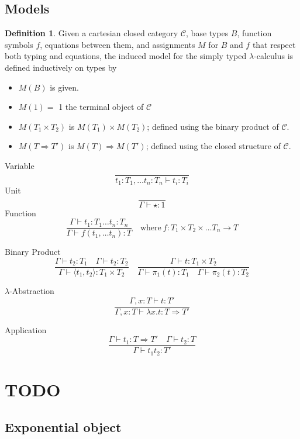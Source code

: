 \documentclass{article}
\theoremstyle{definition}
\newtheorem{definition}{Definition}[section]
\newcommand{\C}{\mathcal{C}}
\begin{document}
\subsection{Models}
\begin{definition}
    Given a cartesian closed category $\C$,
    base types $B$,
    function symbols $f$,
    equations between them,
    and assignments $M$ for $B$ and $f$ that respect both typing and equations,
    the induced model for the simply typed $\lambda$-calculus is defined inductively on types by
    \begin{itemize}
        \item $M(B)$ is given.
        \item $M(1) =$ 1 the terminal object of $\C$
        \item $M(T_1 \times T_2)$ is $M(T_1) \times M(T_2)$;
            defined using the binary product of $\C$.
        \item $M(T \Rightarrow T\prime)$ is $M(T) \Rightarrow M(T\prime)$;
            defined using the closed structure of $\C$.
    \end{itemize}
    Variable
    $$
    \frac{}{t_1 : T_1, \dots t_n : T_n \vdash t_i : T_i}
    $$
    Unit
    $$
    \frac{}{\Gamma \vdash \star : 1}
    $$
    Function
    $$
    \frac{\Gamma \vdash t_1 : T_1 \dots t_n : T_n}{\Gamma \vdash f(t_1,\dots t_n) : T}
    \quad\textrm{where}\ f : T_1 \times T_2 \times \dots T_n \rightarrow T
    $$

    Binary Product
    $$
    \frac
    {\Gamma \vdash t_2 : T_1 \quad \Gamma \vdash t_2 : T_2}
    {\Gamma \vdash \langle t_1, t_2 \rangle : T_1 \times T_2}
    \quad
    \frac
    {\Gamma \vdash t : T_1 \times T_2}
    {\Gamma \vdash \pi_1(t) : T_1 \quad \Gamma \vdash \pi_2(t) : T_2}
    $$

    $\lambda$-Abstraction
    $$
    \frac
    {\Gamma, x : T \vdash t : T\prime}
    {\Gamma, x : T \vdash \lambda x.t : T \Rightarrow T\prime}
    $$

    Application
    $$
    \frac
    {\Gamma \vdash t_1 : T \Rightarrow T\prime \quad \Gamma \vdash t_2 : T}
    {\Gamma \vdash t_1 t_2 : T\prime}
    $$
\end{definition}

\section{TODO}
\subsection{Exponential object}
\end{document}
